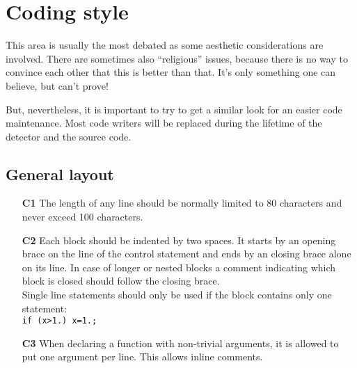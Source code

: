 \documentclass[a4paper,10pt]{article}
\begin{document}
\section{Coding style}

This area is usually the most debated as some aesthetic considerations are
involved. There are sometimes also ``religious'' issues, because there is no
way to convince each other that this is better than that. It's only something
one can believe, but can't prove!

But, nevertheless, it is important to try to get a similar look for an easier
code maintenance. Most code writers will be replaced during the lifetime of
the detector and the source code.

\subsection{General layout}
\begin{itemize}
\item[\bf C1] The length of any line should be normally limited to 80 characters
  and never exceed 100 characters.
\item[\bf C2] Each block should be indented by two spaces. It starts by an opening
  brace on the line of the control statement and ends by an closing brace alone
  on its line. In case of longer or nested blocks a comment indicating which
  block is closed should follow the closing brace.\\
  Single line statements should only be used if the block contains only
  one statement:\\
  {\tt if (x>1.) x=1.;}
\item[\bf C3] When declaring a function with non-trivial arguments, it is
  allowed to put one argument per line. This allows inline comments.
\end{itemize}
\end{document}

